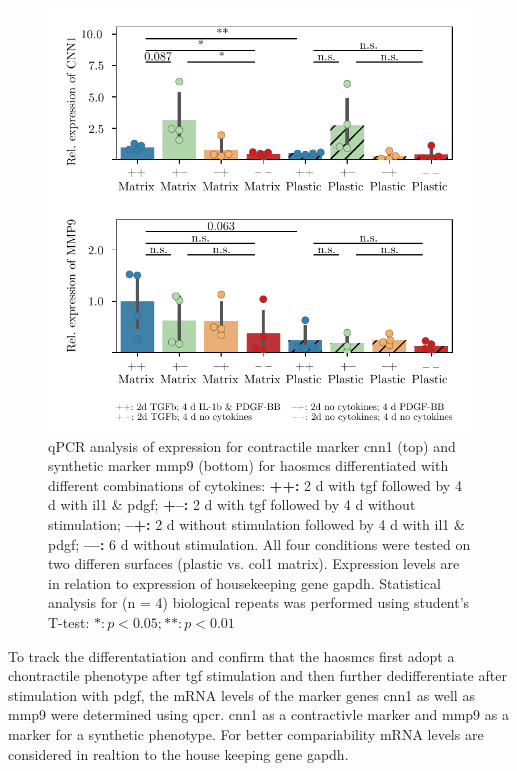     \begin{figure}[h!]
    \capstart
        \centering
    	\includegraphics{Abbildung/qPCR.pdf}

    	\begin{minipage}{\captionwidth}
    		\caption[CNN_qPCR]{ \newline qPCR analysis of expression for contractile marker \ac{cnn1} (top) and synthetic marker \ac{mmp9} (bottom) for \acp{haosmc} differentiated with different combinations of cytokines:
            \textbf{++:} 2 d with \ac{tgf} followed by 4 d with \ac{il1} \& \ac{pdgf};
            \textbf{+–:} 2 d with \ac{tgf} followed by 4 d without stimulation;
            \textbf{–+:} 2 d without stimulation followed by 4 d with \ac{il1} \& \ac{pdgf};
            \textbf{––:} 6 d without stimulation.
            All four conditions were tested on two differen surfaces (plastic vs. \ac{col1} matrix). Expression levels are in relation to expression of housekeeping gene \ac{gapdh}. Statistical analysis for (n = 4) biological repeats was performed using student's T-test: $*: p < 0.05; **: p < 0.01$}
    		\label{fig:qPCR}
    	\end{minipage}
    \end{figure}

    To track the differentatiation and confirm that the \acp{haosmc} first adopt a chontractile phenotype after \ac{tgf} stimulation and then further dedifferentiate after stimulation with \ac{pdgf}, the mRNA levels of the marker genes \ac{cnn1} as well as \ac{mmp9} were determined using \ac{qpcr}. \ac{cnn1} as a contractivle marker and \ac{mmp9} as a marker for a synthetic phenotype. For better compariability mRNA levels are considered in realtion to the house keeping gene \ac{gapdh}.

